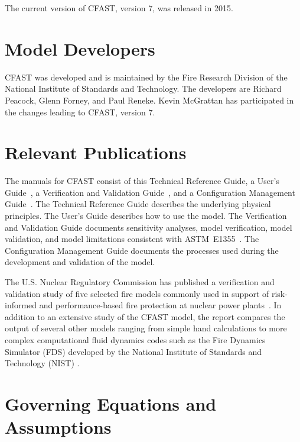 \documentclass[12pt,twoside]{book}
\begin{document}
The current version of CFAST, version 7, was released in 2015.


\section{Model Developers}

CFAST was developed and is maintained by the Fire Research Division of the National Institute of Standards and Technology. The developers are Richard Peacock, Glenn Forney, and Paul Reneke. Kevin McGrattan has participated in the changes leading to CFAST, version 7.

\section{Relevant Publications}

The manuals for CFAST consist of this Technical Reference Guide, a User's Guide~\cite{CFAST_Users_Guide_7}, a Verification and Validation Guide~\cite{CFAST_Valid_Guide_7}, and a Configuration Management Guide~\cite{CFAST_Config_Guide_7}.  The Technical Reference Guide describes the underlying physical principles. The User's Guide describes how to use the model. The Verification and Validation Guide documents sensitivity analyses, model verification, model validation, and model limitations consistent with ASTM~E1355~\cite{ASTM:E1355}. The Configuration Management Guide documents the processes used during the development and validation of the model.

The U.S. Nuclear Regulatory Commission has published a verification and validation study of five selected fire models commonly used in support of risk-informed and performance-based fire protection at nuclear power plants~\cite{NRCNUREG1824}. In addition to an extensive study of the CFAST model, the report compares the output of several other models ranging from simple hand calculations to more complex computational fluid dynamics codes such as the Fire Dynamics Simulator (FDS) developed by the National Institute of Standards and Technology (NIST) \cite{FDS_Tech_Guide_6}.


\section{Governing Equations and Assumptions}
\end{document}
